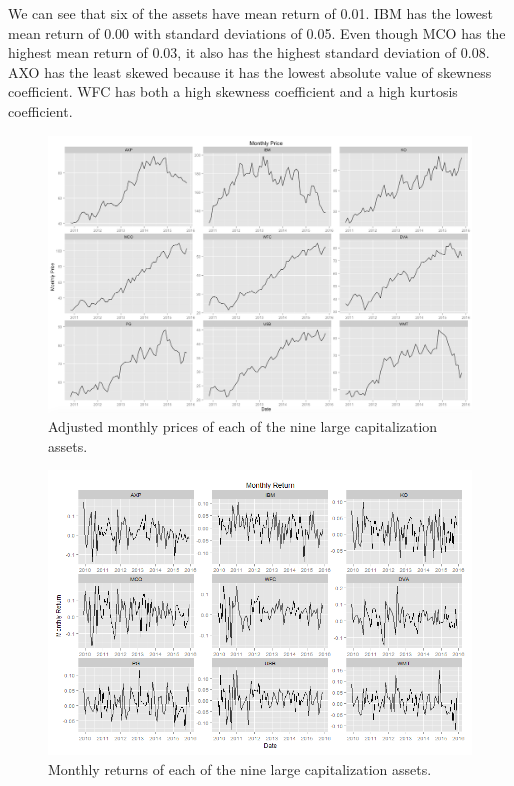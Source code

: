 \documentclass[10pt]{article_simple}
\begin{document}
We can see that six of the assets have mean return of 0.01. IBM has the lowest mean return of
0.00 with standard deviations of 0.05. Even though MCO has the highest mean return of 0.03, it
also has the highest standard deviation of 0.08. AXO has the least skewed because it has the
lowest absolute value of skewness coefficient. WFC has both a high skewness coefficient and a
high kurtosis coefficient.

\begin{figure}[H]
	\centering
  	\includegraphics[width=.85\linewidth]{monthly_price_adjusted}
  	\centering
  	\caption{Adjusted monthly prices of each of the nine large capitalization assets.}
\end{figure}

\begin{figure}[H]
	\centering
  	\includegraphics[width=.85\linewidth]{monthly_returns}
  	\centering
  	\caption{Monthly returns of each of the nine large capitalization assets.}
\end{figure}
\end{document}

